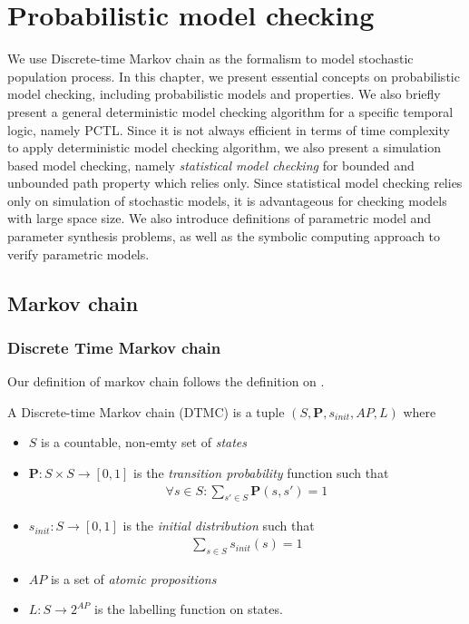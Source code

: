 \chapter{Probabilistic model checking}

We use Discrete-time Markov chain as the formalism to model stochastic population process. In this
chapter, we present essential concepts on probabilistic model checking, including probabilistic
models and properties. We also briefly present a general deterministic model checking algorithm for
a specific temporal logic, namely PCTL. Since it is not always efficient in terms of time complexity
to apply deterministic model checking algorithm, we also present a simulation based model checking,
namely \textit{statistical model checking} for bounded and unbounded path property which relies
only. Since statistical model checking relies only on simulation of stochastic models, it is
advantageous for checking models with large space size. We also introduce definitions of parametric
model and parameter synthesis problems, as well as the symbolic computing approach to verify
parametric models.


\section{Markov chain}
\subsection{Discrete Time Markov chain}
Our definition of markov chain follows the definition on \cite{baier2008principles}.
\begin{definition}
    A Discrete-time Markov chain (DTMC) is a tuple $(S,\mathbf{P}, s_{init}, AP, L)$ where
    \begin{itemize}
        \item $S$ is a countable, non-emty set of \textit{states}
        \item $\mathbf{P}:S\times S \rightarrow [0,1]$ is the \textit{transition probability}
              function such that
              \begin{align*}
                  \forall s \in S : \sum_{s'\in S}\mathbf{P}(s, s') = 1
              \end{align*}
        \item $s_{init}: S \rightarrow [0,1]$ is the \textit{initial distribution} such that
              \begin{align*}
                  \sum_{s\in S}s_{init}(s) = 1
              \end{align*}
        \item $AP$ is a set of \textit{atomic propositions}
        \item $L: S \rightarrow 2^{AP}$ is the labelling function on states.
    \end{itemize}
\end{definition}

